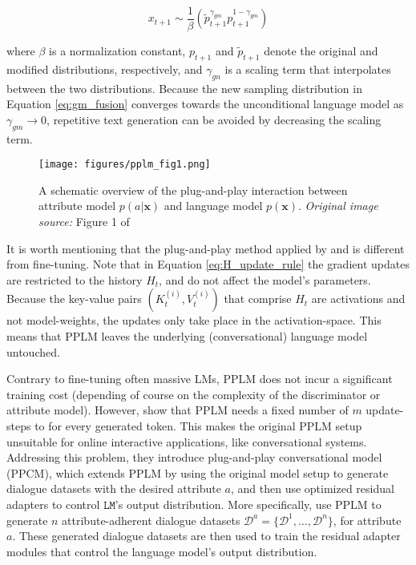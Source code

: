 \begin{equation}
    x_{t + 1} \sim \frac{1}{\beta}
    \left( 
    \tilde{p}_{t + 1}^{\gamma_{gm}} p_{t + 1}^{1 - \gamma_{gm}}
    \right)
    \label{eq:gm_fusion}
\end{equation}

where $\beta$ is a normalization constant, $p_{t + 1}$ and $\tilde{p}_{t + 1}$ denote the original and modified distributions, respectively, and $\gamma_{gn}$ is a scaling term that interpolates between the two distributions. Because the new sampling distribution in Equation \ref{eq:gm_fusion} converges towards the unconditional language model as $\gamma_{gm} \rightarrow 0$, repetitive text generation can be avoided by decreasing the scaling term.


\begin{figure}[H]
    \centering
    \texttt{[image: figures/pplm\_fig1.png]}
    \caption{A schematic overview of the plug-and-play interaction between attribute model $p(a | \textbf{x})$ and language model $p(\textbf{x})$. \textit{Original image source:} Figure 1 of \cite{dathathri2019plug}}
    \label{fig:pplm_schematic_overview}
\end{figure}



It is worth mentioning that the plug-and-play method applied by \cite{dathathri2019plug} and \cite{madotto-etal-2020-plug} is different from fine-tuning. Note that in Equation \ref{eq:H_update_rule} the gradient updates are restricted to the history $H_t$, and do not affect the model's parameters. Because the key-value pairs $(K_t^{(i)}, V_t^{(i)})$ that comprise $H_t$ are activations and not model-weights, the updates only take place in the activation-space. This means that PPLM leaves the underlying (conversational) language model untouched.

Contrary to fine-tuning often massive LMs, PPLM does not incur a significant training cost (depending of course on the complexity of the discriminator or attribute model). However, \cite{madotto-etal-2020-plug} show that PPLM needs a fixed number of $m$ update-steps to for every generated token. This makes the original PPLM setup unsuitable for online interactive applications, like conversational systems. Addressing this problem, they introduce plug-and-play conversational model (PPCM), which extends PPLM by using the original model setup to generate dialogue datasets with the desired attribute $a$, and then use optimized residual adapters \citep{bapna-firat-2019-simple} to control $\texttt{LM}$'s output distribution. More specifically, \cite{madotto-etal-2020-plug} use PPLM to generate $n$ attribute-adherent dialogue datasets $\mathscr{D}^a = \{\mathcal{D}^1, ..., \mathcal{D}^n\}$, for attribute $a$. These generated dialogue datasets are then used to train the residual adapter modules that control the language model's output distribution.

